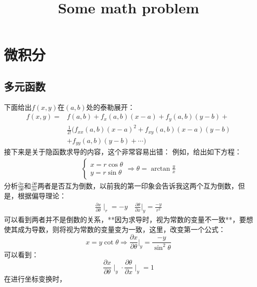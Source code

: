 \documentclass[UTF8]{article}
\title{Some math problem}
\author{}
\date{}
\begin{document}
\maketitle
\thispagestyle{empty}
\newpage
\section{微积分}
\subsection{多元函数}
\noindent 下面给出$f(x,y)$在$(a,b)$处的泰勒展开：
\begin{align*}
    f(x,y) = & f(a,b)+f_x(a,b)(x-a)+f_y(a,b)(y-b)+ \\&\frac{1}{2!}(f_{xx}(a,b)(x-a)^2+f_{xy}(a,b)(x-a)(y-b)\\&+f_{yy}(a,b)(y-b)+\cdots)
\end{align*}
接下来是关于隐函数求导的内容，这个非常容易出错：
例如，给出如下方程：
\begin{align*}
    \begin{cases}
        x = r\cos \theta \\
        y=r \sin \theta
    \end{cases}
    \Rightarrow
    \theta = \arctan \frac{y}{x}
\end{align*}
分析$\frac{\partial x}{\partial \theta}$和$\frac{\partial \theta}{\partial x}$两者是否互为倒数，以前我的第一印象会告诉我这两个互为倒数，但是，根据偏导理论：
\begin{align*}
    \frac{\partial x}{\partial \theta}\mid_r=-y\quad\frac{\partial \theta}{\partial x}|_y =\frac{-y}{r^2}
\end{align*}
可以看到两者并不是倒数的关系，**因为求导时，视为常数的变量不一致**，要想使其成为导数，则将视为常数的变量变为一致，这里，改变第一个公式：
$$
    x = y\cot \theta \Rightarrow \frac{\partial x}{\partial \theta}|_y = \frac{-y}{\sin^2 \theta}
$$
可以看到：
$$\frac{\partial x}{\partial \theta }\mid_ y \cdot \frac{\partial \theta }{\partial x}\mid _y = 1 $$
在进行坐标变换时，
\end{document}
